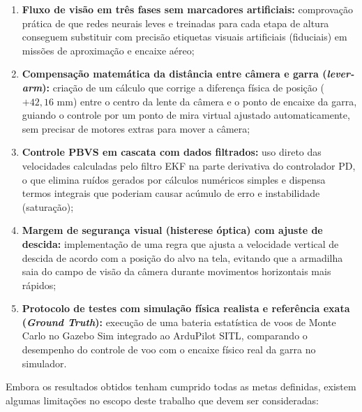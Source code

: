 \begin{enumerate}
	\item \textbf{Fluxo de visão em três fases sem marcadores artificiais:} comprovação prática de que redes neurais leves e treinadas para cada etapa de altura conseguem substituir com precisão etiquetas visuais artificiais (fiduciais) em missões de aproximação e encaixe aéreo;
	\item \textbf{Compensação matemática da distância entre câmera e garra (\textit{lever-arm}):} criação de um cálculo que corrige a diferença física de posição ($+42,16\text{ mm}$) entre o centro da lente da câmera e o ponto de encaixe da garra, guiando o controle por um ponto de mira virtual ajustado automaticamente, sem precisar de motores extras para mover a câmera;
	\item \textbf{Controle PBVS em cascata com dados filtrados:} uso direto das velocidades calculadas pelo filtro EKF na parte derivativa do controlador PD, o que elimina ruídos gerados por cálculos numéricos simples e dispensa termos integrais que poderiam causar acúmulo de erro e instabilidade (saturação);
	\item \textbf{Margem de segurança visual (histerese óptica) com ajuste de descida:} implementação de uma regra que ajusta a velocidade vertical de descida de acordo com a posição do alvo na tela, evitando que a armadilha saia do campo de visão da câmera durante movimentos horizontais mais rápidos;
	\item \textbf{Protocolo de testes com simulação física realista e referência exata (\textit{Ground Truth}):} execução de uma bateria estatística de voos de Monte Carlo no Gazebo Sim integrado ao ArduPilot SITL, comparando o desempenho do controle de voo com o encaixe físico real da garra no simulador.
\end{enumerate}


Embora os resultados obtidos tenham cumprido todas as metas definidas, existem algumas limitações no escopo deste trabalho que devem ser consideradas:

